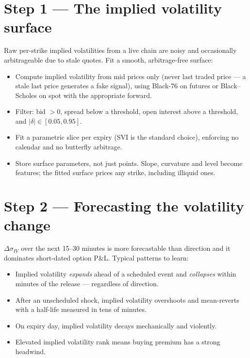 \section{Step 1 --- The implied volatility surface}

Raw per-strike implied volatilities from a live chain are noisy and occasionally
arbitrageable due to stale quotes. Fit a smooth, arbitrage-free surface:

\begin{itemize}
\item Compute implied volatility from mid prices only (never last traded price
--- a stale last price generates a fake signal), using Black-76 on futures or
Black--Scholes on spot with the appropriate forward.
\item Filter: bid $>0$, spread below a threshold, open interest above a
threshold, and $|\delta| \in [0.05, 0.95]$.
\item Fit a parametric slice per expiry (SVI is the standard choice), enforcing
no calendar and no butterfly arbitrage.
\item Store surface parameters, not just points. Slope, curvature and level
become features; the fitted surface prices any strike, including illiquid ones.
\end{itemize}

\section{Step 2 --- Forecasting the volatility change}

\begin{keybox}[title={The most valuable model in the system}]
$\Delta\sigma_{IV}$ over the next 15--30 minutes is more forecastable than
direction and it dominates short-dated option P\&L. Typical patterns to learn:
\begin{itemize}
\item Implied volatility \emph{expands} ahead of a scheduled event and
\emph{collapses} within minutes of the release --- regardless of direction.
\item After an unscheduled shock, implied volatility overshoots and mean-reverts
with a half-life measured in tens of minutes.
\item On expiry day, implied volatility decays mechanically and violently.
\item Elevated implied volatility rank means buying premium has a strong
headwind.
\end{itemize}
\end{keybox}


